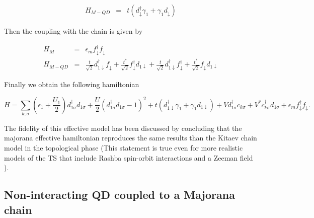 \begin{eqnarray}
H_{M-QD} & = &  t \left(d_{\downarrow}^{\dagger}\gamma_{1}+\gamma_{1}d_{\downarrow}\right) 
\label{eq:MajoranaCoupling}
\end{eqnarray}





Then the coupling with the chain is given by 

\begin{eqnarray*}
H_{M} & = & \epsilon_{m}f_{\downarrow}^{\dagger}f_{\downarrow}\\
H_{M-QD}&=&\frac{t}{\sqrt{2}}d_{1\downarrow}^{\dagger}f_{\downarrow}+\frac{t^{*}}{\sqrt{2}}f_{\downarrow}^{\dagger}d_{1\downarrow}+\frac{t}{\sqrt{2}}d_{1\downarrow}^{\dagger}f_{\downarrow}^{\dagger}+\frac{t^{*}}{\sqrt{2}}f_{\downarrow}d_{1\downarrow}
\end{eqnarray*}

Finally we obtain the following hamiltonian

\begin{equation}
H =\sum_{k,\sigma}\left(\epsilon_1+\frac{U_1}{2}\right)d_{1\sigma}^{\dagger}d_{1\sigma}+ \frac{U}{2}(d_{1\sigma}^{\dagger}d_{1\sigma}-1)^{2} + t \left(d_{1\downarrow}^{\dagger}\gamma_{1}+\gamma_{1}d_{1\downarrow}\right) + Vd^\dagger_{1\sigma}c_{k\sigma}+V^* c^\dagger_{k\sigma}d_{1\sigma}+ \epsilon_{m}f_{\downarrow}^{\dagger}f_{\downarrow}.
\label{eq:QD-Mham}
\end{equation}


The fidelity of this effective model has been discussed by \citet{ruiz-tijerina_interaction_2015}
concluding that the majorana effective hamiltonian reproduces the
same results than the Kitaev chain model in the topological phase
(This statement is true even for more realistic models of the TS that
include Rashba spin-orbit interactions and a Zeeman field \citep{ruiz-tijerina_interaction_2015}
).\\


\subsection{Non-interacting QD coupled to a Majorana chain}


